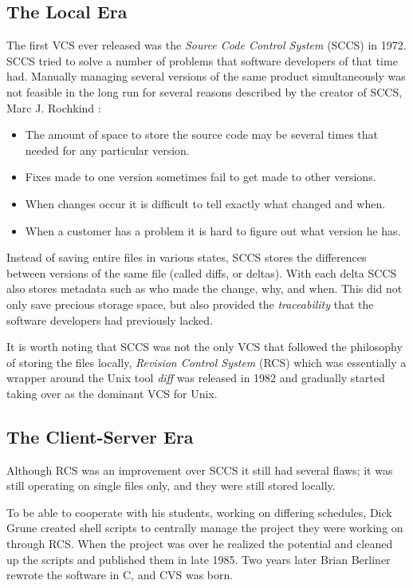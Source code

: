\documentclass{llncs}
\begin{document}
\subsection{The Local Era}
The first VCS ever released was the \emph{Source Code Control System}
(SCCS) in 1972. SCCS tried to solve a number of problems that software
developers of that time had. Manually managing several versions of the
same product simultaneously was not feasible in the long run for
several reasons described by the creator of SCCS, Marc J. Rochkind
\cite{rochkind75}:

\begin{itemize}
 \item The amount of space to store the source code may be several
       times that needed for any particular version.
 \item Fixes made to one version sometimes fail to get made to
       other versions.
 \item When changes occur it is difficult to tell exactly what changed
       and when.
 \item When a customer has a problem it is hard to figure out what
       version he has.
\end{itemize}

Instead of saving entire files in various states, SCCS stores the
differences between versions of the same file (called diffs, or
deltas). With each delta SCCS also stores metadata such as who made
the change, why, and when. This did not only save precious storage
space, but also provided the \emph{traceability} that the software
developers had previously lacked.

It is worth noting that SCCS was not the only VCS that followed the
philosophy of storing the files locally, \emph{Revision Control
System} (RCS) which was essentially a wrapper around the Unix tool
\emph{diff} was released in 1982 and gradually started taking over as
the dominant VCS for Unix.

\subsection{The Client-Server Era}
Although RCS was an improvement over SCCS it still had several flaws;
it was still operating on single files only, and they were still
stored locally. 

To be able to cooperate with his students, working on differing
schedules, Dick Grune created shell scripts to centrally manage the
project they were working on through RCS. When the project was over he
realized the potential and cleaned up the scripts and published them
in late 1985. Two years later Brian Berliner rewrote the software in
C, and CVS was born.
\end{document}
